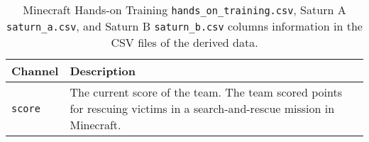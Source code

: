 \begin{table}[h]
\centering
\begin{tabularx}{\textwidth}{|l|X|}
\hline
\textbf{Channel} & \textbf{Description} \\
\hline
\texttt{score} & The current score of the team. The team scored points for rescuing victims in a search-and-rescue mission in Minecraft.\\
\hline
\end{tabularx}
\caption{Minecraft Hands-on Training \texttt{hands\_on\_training.csv}, Saturn A \texttt{saturn\_a.csv}, and Saturn B \texttt{saturn\_b.csv} columns information in the CSV files of the derived data.}
\label{tab:minecraft_task_columns}
\end{table}



